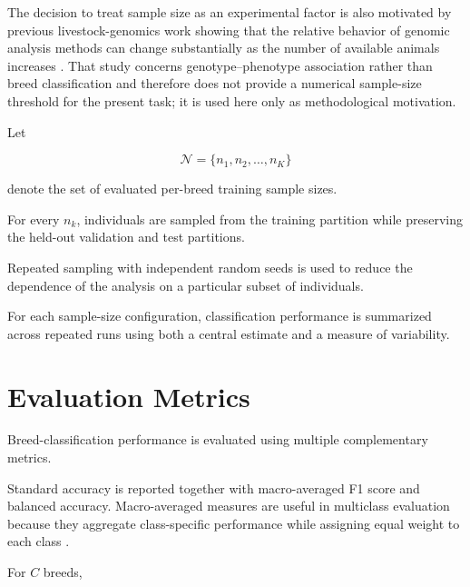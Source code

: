 The decision to treat sample size as an experimental factor is also
motivated by previous livestock-genomics work showing that the
relative behavior of genomic analysis methods can change
substantially as the number of available animals increases
\cite{manca2020multivariate}.
That study concerns genotype--phenotype association rather than
breed classification and therefore does not provide a numerical
sample-size threshold for the present task; it is used here only as
methodological motivation.

Let

\begin{equation}
    \mathcal{N}
    =
    \{
        n_1,
        n_2,
        \ldots,
        n_K
    \}
    \label{eq:sample_sizes}
\end{equation}

denote the set of evaluated per-breed training sample sizes.

For every $n_k$, individuals are sampled from the training partition
while preserving the held-out validation and test partitions.

Repeated sampling with independent random seeds is used to reduce the
dependence of the analysis on a particular subset of individuals.

%
%

For each sample-size configuration, classification performance is
summarized across repeated runs using both a central estimate and a
measure of variability.



\section{Evaluation Metrics}
\label{sec:evaluation_metrics}

Breed-classification performance is evaluated using multiple
complementary metrics.

Standard accuracy is reported together with macro-averaged F1 score
and balanced accuracy.
Macro-averaged measures are useful in multiclass evaluation because
they aggregate class-specific performance while assigning equal
weight to each class
\cite{sokolova2009systematic}.

For $C$ breeds,

